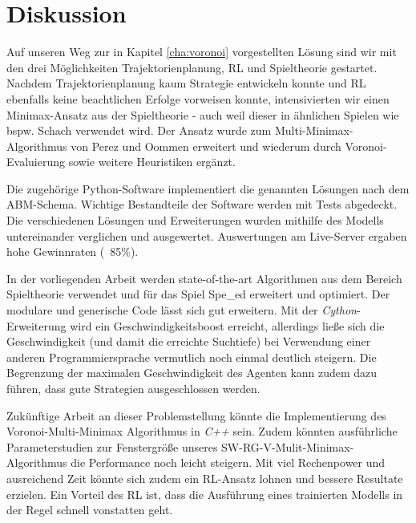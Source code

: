 \chapter{Diskussion}
\label{cha:Diskussion}

Auf unseren Weg zur in Kapitel \ref{cha:voronoi} vorgestellten Lösung sind wir mit den drei Möglichkeiten Trajektorienplanung, \acrshort{RL} und Spieltheorie gestartet. Nachdem Trajektorienplanung kaum Strategie entwickeln konnte und \acrshort{RL} ebenfalls keine beachtlichen Erfolge vorweisen konnte, intensivierten wir einen Minimax-Ansatz aus der Spieltheorie - auch weil dieser in ähnlichen Spielen wie bspw. Schach verwendet wird. Der Ansatz wurde zum Multi-Minimax-Algorithmus von Perez und Oommen erweitert und wiederum durch Voronoi-Evaluierung sowie weitere Heuristiken ergänzt.

Die zugehörige Python-Software implementiert die genannten Lösungen nach dem \acrshort{ABM}-Schema. Wichtige Bestandteile der Software werden mit Tests abgedeckt. Die verschiedenen Lösungen und Erweiterungen wurden mithilfe des Modells untereinander verglichen und ausgewertet. Auswertungen am Live-Server ergaben hohe Gewinnraten (~85\%). 

In der vorliegenden Arbeit werden state-of-the-art Algorithmen aus dem Bereich Spieltheorie verwendet und für das Spiel Spe\_ed erweitert und optimiert. Der modulare und generische Code lässt sich gut erweitern. Mit der \textit{Cython}-Erweiterung wird ein Geschwindigkeitsboost erreicht, allerdings ließe sich die Geschwindigkeit (und damit die erreichte Suchtiefe) bei Verwendung einer anderen Programmiersprache vermutlich noch einmal deutlich steigern. Die Begrenzung der maximalen Geschwindigkeit des Agenten kann zudem dazu führen, dass gute Strategien ausgeschlossen werden.

Zukünftige Arbeit an dieser Problemstellung könnte die Implementierung des Voronoi-Multi-Minimax Algorithmus in \textit{C++} sein. Zudem könnten ausführliche Parameterstudien zur Fenstergröße unseres SW-RG-V-Mulit-Minimax-Algorithmus die Performance noch leicht steigern. Mit viel Rechenpower und ausreichend Zeit könnte sich zudem ein \acrshort{RL}-Ansatz lohnen und bessere Resultate erzielen. Ein Vorteil des \acrshort{RL} ist, dass die Ausführung eines trainierten Modells in der Regel schnell vonstatten geht.
